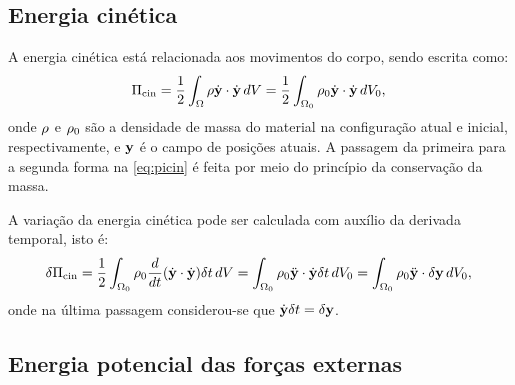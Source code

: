 \documentclass[Tese.tex]{subfiles}
\begin{document}

\subsection{Energia cinética}

A energia cinética está relacionada aos movimentos do corpo, sendo escrita como:
\begin{equation}\label{eq:picin}
\Pi_\text{cin} = \dfrac{1}{2}\int_{\Omega}\rho \dot{\mathbf{y}}\cdot\dot{\mathbf{y}}\,dV = \dfrac{1}{2}\int_{\Omega_0}\rho_0 \dot{\mathbf{y}}\cdot\dot{\mathbf{y}}\,dV_0, \\
\end{equation}
onde $\rho$ e $\rho_0$ são a densidade de massa do material na configuração atual e inicial, respectivamente, e $\mathbf{y}$ é o campo de posições atuais. A passagem da primeira para a segunda forma na \cref{eq:picin} é feita por meio do princípio da conservação da massa. 

A variação da energia cinética pode ser calculada com auxílio da derivada temporal, isto é:
\begin{equation}\label{eq:dpicin}
\delta\Pi_\text{cin} = \dfrac{1}{2}\int_{\Omega_0}\rho_0 \dfrac{d}{dt}(\dot{\mathbf{y}}\cdot\dot{\mathbf{y}})\delta t\,dV = \int_{\Omega_0}\rho_0 \ddot{\mathbf{y}}\cdot\dot{\mathbf{y}}\delta t\,dV_0 = \int_{\Omega_0}\rho_0 \ddot{\mathbf{y}}\cdot\delta \mathbf{y}\,dV_0, \\
\end{equation}
onde na última passagem considerou-se que $\dot{\mathbf{y}}\delta t = \delta\mathbf{y}$.

\subsection{Energia potencial das forças externas}\label{subsec:externas}
\end{document}
